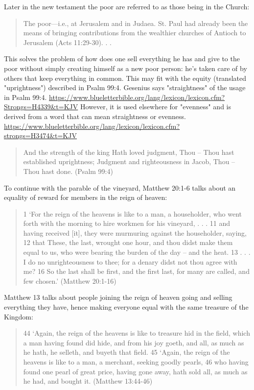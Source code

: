 \documentclass[11pt]{article}
\begin{document}
Later in the new testament the poor are referred to as those being in the Church:
\begin{quote}
The poor—i.e., at Jerusalem and in Judaea. St. Paul had already been the means of bringing contributions from the wealthier churches of Antioch to Jerusalem (Acts 11:29-30). . . \cite{the poor}
\end{quote}
This solves the problem of how does one sell everything he has and give to the poor without simply creating himself as a new poor person: he's taken care of by others that keep everything in common. This may fit with the equity (translated "uprightness") described in Psalm 99:4. Gesenius says "straightness" of the usage in Psalm 99:4. \url{https://www.blueletterbible.org/lang/lexicon/lexicon.cfm?Strongs=H4339&t=KJV} However, it is used elsewhere for "evenness" and is derived from a word that can mean straightness or evenness. \url{https://www.blueletterbible.org/lang/lexicon/lexicon.cfm?strongs=H3474&t=KJV}
\begin{quote}
And the strength of the king Hath loved judgment, Thou -- Thou hast established uprightness; Judgment and righteousness in Jacob, Thou -- Thou hast done. (Psalm 99:4) 
\end{quote}
To continue with the parable of the vineyard, Matthew 20:1-6 talks about an equality of reward for members in the reign of heaven:
\begin{quote}
1 `For the reign of the heavens is like to a man, a householder, who went forth with the morning to hire workmen for his vineyard, . . . 11 and having received [it], they were murmuring against the householder, saying, 12 that These, the last, wrought one hour, and thou didst make them equal to us, who were bearing the burden of the day -- and the heat. 13 . . . I do no unrighteousness to thee; for a denary didst not thou agree with me? 16 So the last shall be first, and the first last, for many are called, and few chosen.' (Matthew 20:1-16)
\end{quote}
Matthew 13 talks about people joining the reign of heaven going and selling everything they have, hence making everyone equal with the same treasure of the Kingdom:
\begin{quote}
44 `Again, the reign of the heavens is like to treasure hid in the field, which a man having found did hide, and from his joy goeth, and all, as much as he hath, he selleth, and buyeth that field. 45 `Again, the reign of the heavens is like to a man, a merchant, seeking goodly pearls, 46 who having found one pearl of great price, having gone away, hath sold all, as much as he had, and bought it. (Matthew 13:44-46)
\end{quote}
\end{document}
